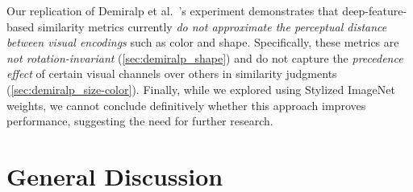 \documentclass[sigconf]{acmart}
\begin{document}
Our replication of Demiralp et al.~\cite{demiralp2014learning}'s experiment demonstrates that deep-feature-based similarity metrics currently \textit{do not approximate the perceptual distance between visual encodings} such as color and shape. Specifically, these metrics are \textit{not rotation-invariant} (\cref{sec:demiralp_shape}) and do not capture the \textit{precedence effect} of certain visual channels over others in similarity judgments (\cref{sec:demiralp_size-color}). Finally, while we explored using Stylized ImageNet weights, we cannot conclude definitively whether this approach improves performance, suggesting the need for further research.
\section{General Discussion}
\label{sec:discussion}
\end{document}
